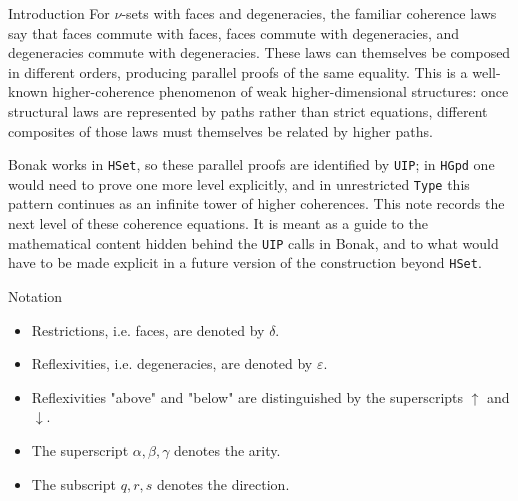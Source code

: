 \documentclass[aspectratio=169,11pt]{beamer}
\begin{document}
\begin{frame}[t]{Introduction}
\small
For $\nu$-sets with faces and degeneracies, the familiar coherence laws
say that faces commute with faces, faces commute with degeneracies,
and degeneracies commute with degeneracies. These laws can themselves
be composed in different orders, producing parallel proofs of the same
equality. This is a well-known higher-coherence phenomenon of weak
higher-dimensional structures: once structural laws are represented by
paths rather than strict equations, different composites of those laws
must themselves be related by higher paths.

\medskip
Bonak works in \texttt{HSet}, so these parallel proofs are identified by
\texttt{UIP}; in \texttt{HGpd} one would need to prove one more level explicitly,
and in unrestricted \texttt{Type} this pattern continues as an infinite tower
of higher coherences. This note records the next level of these coherence
equations. It is meant as a guide to the mathematical content hidden behind the
\texttt{UIP} calls in Bonak, and to what would have to be made explicit in a
future version of the construction beyond \texttt{HSet}.
\end{frame}

\begin{frame}[t]{Notation}
\begin{itemize}
\item[$\blacktriangleright$] Restrictions, i.e. faces, are denoted by $\delta$.
\item[$\blacktriangleright$] Reflexivities, i.e. degeneracies, are denoted by $\varepsilon$.
\item[$\blacktriangleright$] Reflexivities "above" and "below" are distinguished by the superscripts $\uparrow$ and $\downarrow$.
\item[$\blacktriangleright$] The superscript $\alpha,\beta,\gamma$ denotes the arity.
\item[$\blacktriangleright$] The subscript $q,r,s$ denotes the direction.
\end{itemize}
\end{frame}
\end{document}
